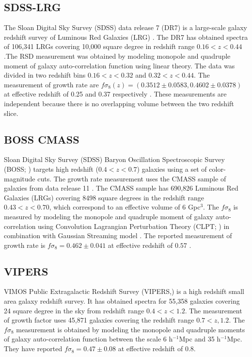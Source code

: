 \subsection{SDSS-LRG}
The Sloan Digital Sky Survey (SDSS) data release 7 (DR7) is a large-scale galaxy redshift survey of Luminous Red Galaxies (LRG) \citep{Eisenstein2011}. The DR7 has obtained spectra of 106,341 LRGs covering 10,000 square degree in redshift range $0.16<z<0.44$.The RSD measurement was obtained by modeling monopole and quadruple moment of galaxy auto-correlation function using linear theory. The data was divided in two redshift bins $0.16<z<0.32$ and $0.32<z<0.44$. The measurement of growth rate are $f\sigma_8(z)=(0.3512 \pm 0.0583, 0.4602 \pm 0.0378)$ at effective redshift of 0.25 and 0.37 respectively \citep{SDSSLRG2012}. These measurements are independent because there is no overlapping volume between the two redshift slice.

\subsection{BOSS CMASS}
Sloan Digital Sky Survey (SDSS) Baryon Oscillation Spectroscopic Survey (BOSS; \citet{Dawson2013}) targets high redshift ($0.4 < z < 0.7$) galaxies using a set of color-magnitude cuts. The growth rate measurement uses the CMASS sample of galaxies \citep{Bolton2012} from data release 11 \citep{Alam2014}. The CMASS sample has 690,826 Luminous Red Galaxies (LRGs) covering 8498 square degrees in the redshift range $0.43<z<0.70$, which correspond to an effective volume of 6 Gpc$^{3}$. The $f\sigma_8$ is measured by modeling the monopole and quadruple moment of galaxy auto-correlation using Convolution Lagrangian Perturbation Theory (CLPT; \citet{Carlson12}) in combination with Gaussian Streaming model \citep{Wang13}. The reported measurement of growth rate is $f\sigma_8=0.462 \pm 0.041$ at effective redshift of $0.57$ \citep{Alam2015}.

\subsection{VIPERS}
VIMOS Public Extragalactic Redshift Survey (VIPERS,\cite{Vipers}) is a high redshift small area galaxy redshift survey.  It has obtained spectra for 55,358 galaxies covering 24 square degree in the sky from redshift range $0.4<z<1.2$.  The measurement of growth factor uses 45,871 galaxies covering the redshift range $0.7<z,1.2$.
The $f\sigma_8$  measurement is obtained by modeling the monopole and quadruple moments of galaxy auto-correlation function between the scale 6 h$^{-1}$Mpc and 35 h$^{-1}$Mpc. They have reported $f\sigma_8=0.47 \pm 0.08$ at effective redshift of 0.8. 

